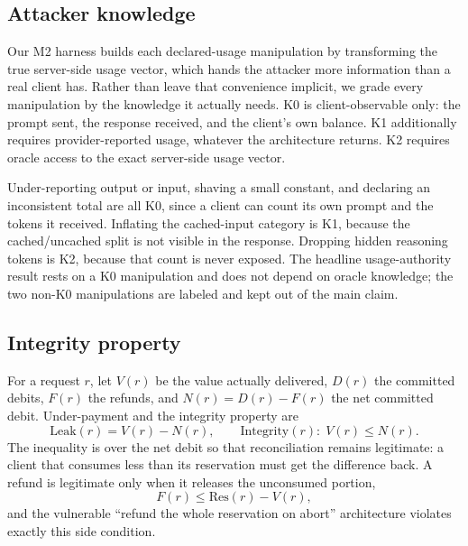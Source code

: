 \documentclass[manuscript,review]{acmart}
\begin{document}
\subsection{Attacker knowledge}
Our M2 harness builds each declared-usage manipulation by transforming the true
server-side usage vector, which hands the attacker more information than a real client
has. Rather than leave that convenience implicit, we grade every manipulation by the
knowledge it actually needs. K0 is client-observable only: the prompt sent, the response
received, and the client's own balance. K1 additionally requires provider-reported usage,
whatever the architecture returns. K2 requires oracle access to the exact server-side
usage vector.

Under-reporting output or input, shaving a small constant, and declaring an inconsistent
total are all K0, since a client can count its own prompt and the tokens it received.
Inflating the cached-input category is K1, because the cached/uncached split is not
visible in the response. Dropping hidden reasoning tokens is K2, because that count is
never exposed. The headline usage-authority result rests on a K0 manipulation and does not
depend on oracle knowledge; the two non-K0 manipulations are labeled and kept out of the
main claim.

\subsection{Integrity property}
For a request $r$, let $V(r)$ be the value actually delivered, $D(r)$ the committed
debits, $F(r)$ the refunds, and $N(r) = D(r) - F(r)$ the net committed debit.
Under-payment and the integrity property are
\begin{equation}
\mathrm{Leak}(r) = V(r) - N(r), \qquad
\mathrm{Integrity}(r):\; V(r) \le N(r).
\label{eq:integrity}
\end{equation}
The inequality is over the net debit so that reconciliation remains legitimate: a client
that consumes less than its reservation must get the difference back. A refund is
legitimate only when it releases the unconsumed portion,
\begin{equation}
F(r) \le \mathrm{Res}(r) - V(r),
\label{eq:refund}
\end{equation}
and the vulnerable ``refund the whole reservation on abort'' architecture violates
exactly this side condition.
\end{document}
